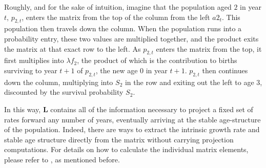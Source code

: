 Roughly, and for the sake of intuition, imagine that the population aged $2$
in year $t$, $p_{2,t}$, enters the matrix from the top of the  column from
the left $a2_t$. This population then travels down the column. When the
 population runs into a probability entry, these two values
are multiplied together, and the product exits the matrix at that exact row to
the left. As $p_{2,t}$ enters the matrix from the top, it first multiplies into $\lambda
f_2$, the product of which is the contribution to births surviving to year
$t+1$ of $p_{2,t}$, the new age 0 in year $t+1$. $p_{2,t}$ then continues down
the column, multiplying into $S_2$ in the  row and exiting out the left
to age 3, discounted by the survival probability $S_2$.

In this way, $\textbf{L}$ contains all of the information necessary to project a
fixed set of rates forward any number of years, eventually arriving at the stable
age-structure of the population. Indeed, there are ways to extract the intrinsic
growth rate and stable age structure directly from the matrix without
carrying projection computations. For details on how to calculate the individual
matrix elements, please refer to \cite{caswell2001matrix}, as mentioned before.




